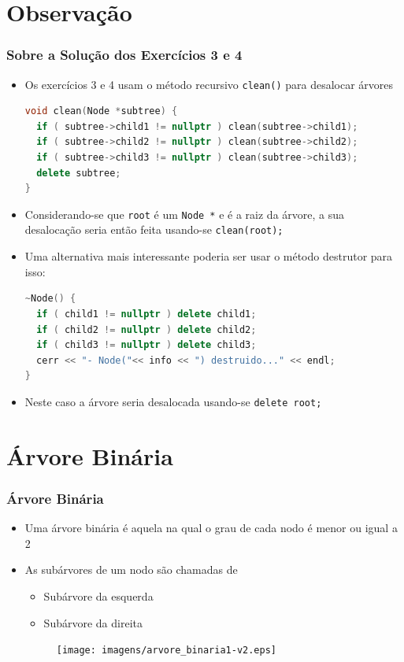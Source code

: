 \documentclass[aspectratio=169]{beamer}
\begin{document}
\section{Observação}

\begin{frame}[fragile]\frametitle{Sobre a Solução dos Exercícios 3 e 4}
\begin{itemize}
	\item Os exercícios 3 e 4 usam o método recursivo \texttt{clean()} para desalocar árvores
\begin{lstlisting}[language=C++,basicstyle=\ttfamily\tiny]
void clean(Node *subtree) {
  if ( subtree->child1 != nullptr ) clean(subtree->child1);
  if ( subtree->child2 != nullptr ) clean(subtree->child2);
  if ( subtree->child3 != nullptr ) clean(subtree->child3);
  delete subtree;
}
\end{lstlisting}
	\item Considerando-se que \texttt{root} é um \texttt{Node *} e é a raiz da árvore, a sua desalocação seria então feita usando-se \texttt{clean(root);}
\item Uma alternativa mais interessante poderia ser usar o método destrutor para isso:
\begin{lstlisting}[language=C++,basicstyle=\ttfamily\tiny]
~Node() {
  if ( child1 != nullptr ) delete child1;
  if ( child2 != nullptr ) delete child2;
  if ( child3 != nullptr ) delete child3;
  cerr << "- Node("<< info << ") destruido..." << endl;
}
\end{lstlisting}
	\item Neste caso a árvore seria desalocada usando-se \texttt{delete root;}
\end{itemize}
\end{frame}

\section{Árvore Binária}

\begin{frame}[fragile]\frametitle{Árvore Binária}
\begin{itemize}
	\item Uma árvore binária é aquela na qual o grau de cada nodo é menor ou igual a 2
	\item As subárvores de um nodo são chamadas de
	\begin{itemize}
		\item Subárvore da esquerda
		\item Subárvore da direita
	\end{itemize}
\begin{figure}[h]
	\centering
	\texttt{[image: imagens/arvore\_binaria1-v2.eps]}
\end{figure}
\end{itemize}
\end{frame}
\end{document}

